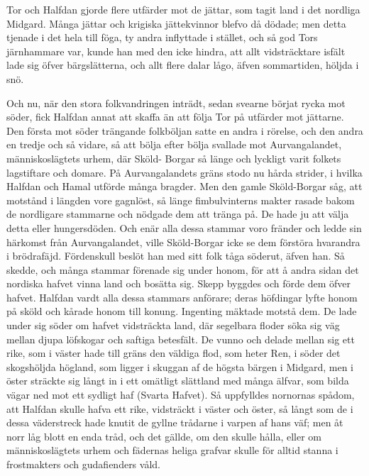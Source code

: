Tor och Halfdan gjorde flere utfärder mot de jättar, som tagit land i
det nordliga Midgard. Många jättar och krigiska jättekvinnor blefvo då
dödade; men detta tjenade i det hela till föga, ty andra inflyttade i
stället, och så god Tors järnhammare var, kunde han med den icke hindra,
att allt vidsträcktare isfält lade sig öfver bärgslätterna, och allt
flere dalar lågo, äfven sommartiden, höljda i snö.

Och nu, när den stora folkvandringen inträdt, sedan svearne börjat rycka
mot söder, fick Halfdan annat att skaffa än att följa Tor på utfärder
mot jättarne. Den första mot söder trängande folkböljan satte en andra i
rörelse, och den andra en tredje och så vidare, så att bölja efter bölja
svallade mot Aurvangalandet, människoslägtets urhem, där Sköld- Borgar
så länge och lyckligt varit folkets lagstiftare och domare. På
Aurvangalandets gräns stodo nu hårda strider, i hvilka Halfdan och Hamal
utförde många bragder. Men den gamle Sköld-Borgar såg, att motstånd i
längden vore gagnlöst, så länge fimbulvinterns makter rasade bakom de
nordligare stammarne och nödgade dem att tränga på. De hade ju att välja
detta eller hungersdöden. Och enär alla dessa stammar voro fränder och
ledde sin härkomst från
Aurvangalandet\protect\hypertarget{lb1625905.xhtmlux5cux23start97}{}{}\protect\hypertarget{lb1625905.xhtmlux5cux23start97-a}{}{}\protect\hypertarget{lb1625905.xhtmlux5cux23start97-b}{}{}\protect\hypertarget{lb1625905.xhtmlux5cux23start97-c}{}{}\protect\hypertarget{lb1625905.xhtmlux5cux23start97-d}{}{},
ville Sköld-Borgar icke se dem förstöra hvarandra i brödrafäjd.
Fördenskull beslöt han med sitt folk tåga söderut, äfven han. Så skedde,
och många stammar förenade sig under honom, för att å andra sidan det
nordiska hafvet vinna land och bosätta sig. Skepp byggdes och förde dem
öfver hafvet. Halfdan vardt alla dessa stammars anförare; deras
höfdingar lyfte honom på sköld och kårade honom till konung. Ingenting
mäktade motstå dem. De lade under sig söder om hafvet vidsträckta land,
där segelbara floder söka sig väg mellan djupa löfskogar och saftiga
betesfält. De vunno och delade mellan sig ett rike, som i väster hade
till gräns den väldiga flod, som heter Ren, i söder det skogshöljda
högland, som ligger i skuggan af de högsta bärgen i Midgard, men i öster
sträckte sig långt in i ett omätligt slättland med många älfvar, som
bilda vägar ned mot ett sydligt haf (Svarta Hafvet). Så uppfylldes
nornornas spådom, att Halfdan skulle hafva ett rike, vidsträckt i väster
och öster, så långt som de i dessa väderstreck hade knutit de gyllne
trådarne i varpen af hans väf; men åt norr låg blott en enda tråd, och
det gällde, om den skulle hålla, eller om människoslägtets urhem och
fädernas heliga grafvar skulle för alltid stanna i frostmakters och
gudafienders våld.

